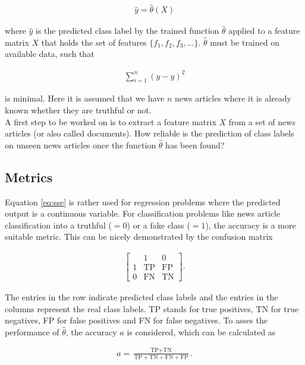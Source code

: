 \documentclass[a4paper,12pt,nottoc]{article}
\begin{document}
\begin{gather}
\hat{y} =\hat{\theta}(X)
\end{gather}

\noindent where $\hat{y}$ is the predicted class label by the trained function $\hat{\theta}$ applied to a feature matrix $X$ that holds the set of features $\{f_{1}, f_{2}, f_{3}, ... \}$. $\hat{\theta}$ must be trained on available data, such that

\begin{gather}\label{eq:sse}
\sum_{i=1}^{n} \left(y - \hat{y} \right)^2
\end{gather}

\noindent is minimal. Here it is assumed that we have $n$ news articles where it is already known whether they are truthful or not.\\

\noindent A first step to be worked on is to extract a feature matrix $X$ from a set of news articles (or also called documents). How reliable is the prediction of class labels on unseen news articles once the function $\hat{\theta}$ has been found?

\subsection{Metrics}

Equation \ref{eq:sse} is rather used for regression problems where the predicted output is a continuous variable. For classification problems like news article classification into a truthful ($= 0$) or a fake class ($= 1$), the accuracy is a more suitable metric. This can be nicely demonstrated by the confusion matrix

\begin{gather}
\begin{bmatrix}
& 1 & 0 \\
1 & \textrm{TP} & \textrm{FP} \\
0 & \textrm{FN} & \textrm{TN}
\end{bmatrix}.
\end{gather}

\noindent The entries in the row indicate predicted class labels and the entries in the columns represent the real class labels. TP stands for true positives, TN for true negatives, FP for false positives and FN for false negatives. To asses the performance of $\hat{\theta}$, the accuracy $a$ is considered, which can be calculated as

\begin{gather}\label{eq:acc}
a = \frac{\textrm{TP} + \textrm{TN}}{\textrm{TP} + \textrm{TN} + \textrm{FN} + \textrm{FP}}.
\end{gather}
\end{document}
